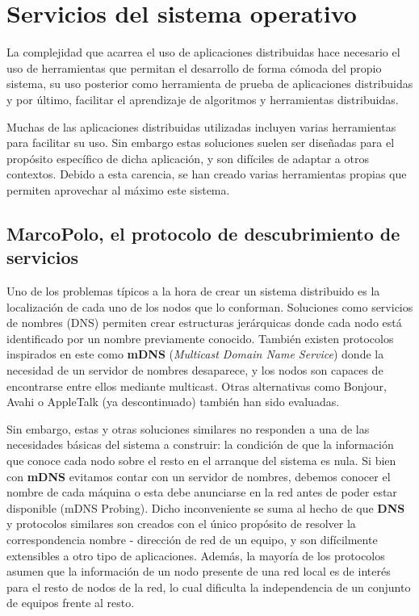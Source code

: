 \chapter{Servicios del sistema operativo}

La complejidad que acarrea el uso de aplicaciones distribuidas hace necesario el uso de herramientas que permitan el desarrollo de forma cómoda del propio sistema, su uso posterior como herramienta de prueba de aplicaciones distribuidas y por último, facilitar el aprendizaje de algoritmos y herramientas distribuidas.

Muchas de las aplicaciones distribuidas utilizadas incluyen varias herramientas para facilitar su uso. Sin embargo estas soluciones suelen ser diseñadas para el propósito específico de dicha aplicación, y son difíciles de adaptar a otros contextos. Debido a esta carencia, se han creado varias herramientas propias que permiten aprovechar al máximo este sistema.

\section{MarcoPolo, el protocolo de descubrimiento de servicios}
\label{marcopolo}
Uno de los problemas típicos a la hora de crear un sistema distribuido es la localización de cada uno de los nodos que lo conforman. Soluciones como servicios de nombres (DNS) permiten crear estructuras jerárquicas donde cada nodo está identificado por un nombre previamente conocido. También existen protocolos inspirados en este como \textbf{mDNS} (\textit{Multicast Domain Name Service}) donde la necesidad de un servidor de nombres desaparece, y los nodos son capaces de encontrarse entre ellos mediante multicast\cite{rfc6762}. Otras alternativas como Bonjour, Avahi o AppleTalk (ya descontinuado) también han sido evaluadas.

Sin embargo, estas y otras soluciones similares no responden a una de las necesidades básicas del sistema a construir: la condición de que la información que conoce cada nodo sobre el resto en el arranque del sistema es nula. Si bien con \textbf{mDNS} evitamos contar con un servidor de nombres, debemos conocer el nombre de cada máquina o esta debe anunciarse en la red antes de poder estar disponible (mDNS Probing). Dicho inconveniente se suma al hecho de que \textbf{DNS} y protocolos similares son creados con el único propósito de resolver la correspondencia nombre - dirección de red de un equipo, y son difícilmente extensibles a otro tipo de aplicaciones. Además, la mayoría de los protocolos asumen que la información de un nodo presente de una red local es de interés para el resto de nodos de la red, lo cual dificulta la independencia de un conjunto de equipos frente al resto.

